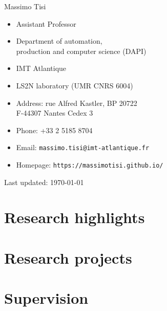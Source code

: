 \documentclass[10pt,a4paper]{article}
\def\name{Massimo Tisi}
\begin{document}
{\huge \name}


\vspace{0.25in}
\begin{minipage}[t]{0.5\textwidth}
  \begin{itemize}
  \item Assistant Professor
  \item Department of automation,\\
    production and computer science (DAPI)
  \item IMT Atlantique
  \item LS2N laboratory (UMR CNRS 6004)
  \end{itemize}

\end{minipage}
\begin{minipage}[t]{0.5\textwidth}
  \begin{itemize}
  \item Address: rue Alfred Kastler, BP 20722 \\
  F-44307 Nantes Cedex 3
  \item Phone: +33 2 5185 8704
  \item Email: \texttt{massimo.tisi@imt-atlantique.fr}
  \item Homepage: \texttt{https://massimotisi.github.io/}
  \end{itemize}
\end{minipage}

\vfill
\tableofcontents

\vfill
\begin{center}
  \begin{small}
    Last updated: \today
  \end{small}
\end{center}

\newpage
\section{Research highlights}


\newpage
\section{Research projects}
{
  
}

\newpage  
\section{Supervision}
{
  \let\section\paragraph
  
}
 
\end{document}
